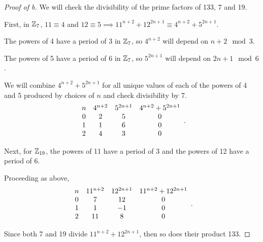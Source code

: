 \documentclass[../hw2]{subfiles}
\begin{document}
\begin{proof}[Proof of b]
	We will check the divisibility of the prime factors of 133, 7 and 19.

	First, in $\mathbb{Z}_7$, $11\equiv 4$ and $12\equiv 5 \implies 11^{n+2} + 12^{2n+1} \equiv  4^{n+2}+5^{2n+1}$.

	The powers of 4 have a period of 3 in $\mathbb{Z}_7$, so $4^{n+2}$ will depend on  $n+2 \mod{3}$.

	The powers of 5 have a period of 6 in $\mathbb{Z}_7$, so $5^{2n+1}$ will depend on $2n+1 \mod{6}$.

	We will combine $4^{n+2} + 5^{2n+1}$ for all unique values of each of the powers of 4 and 5 produced by choices of  $n$ and check divisibility by 7.
	\[
		\begin{array}{c c c c}
			n & 4^{n+2} & 5^{2n+1} & 4^{n+2} + 5^{2n+1} \\
			0 & 2       & 5        & 0                  \\
			1 & 1       & 6        & 0                  \\
			2 & 4       & 3        & 0                  \\
		\end{array}
		.\]

	Next, for $\mathbb{Z}_{19}$, the powers of 11 have a period of 3 and the powers of 12 have a period of 6.

	Proceeding as above,
	\[
		\begin{array}{c c c c}
			n & 11^{n+2} & 12^{2n+1} & 11^{n+2} + 12^{2n+1} \\
			0 & 7        & 12        & 0                    \\
			1 & 1        & -1        & 0                    \\
			2 & 11       & 8         & 0                    \\
		\end{array}
		.\]

	Since both 7 and 19 divide $11^{n+2} + 12^{2n+1}$, then so does their product 133.
\end{proof}
\end{document}

